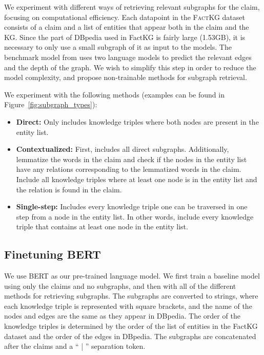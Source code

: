 \documentclass[11pt]{article}
\begin{document}
We experiment with different ways of retrieving relevant subgraphs for the claim, focusing on computational efficiency. Each datapoint in the \textsc{FactKG} dataset consists of a claim and a list of entities that appear both in the claim and the KG. Since the part of DBpedia used in FactKG is fairly large (1.53GB), it is necessary to only use a small subgraph of it as input to the models. The benchmark model from \citet{kim2023factkg} uses two language models to predict the relevant edges and the depth of the graph. We wish to simplify this step in order to reduce the model complexity, and propose non-trainable methods for subgraph retrieval.



We experiment with the following methods (examples can be found in Figure~\ref{fig:subgraph_types}):

\begin{itemize}
    \item \textbf{Direct:} Only includes knowledge triples where both nodes are present in the entity list.
    \item \textbf{Contextualized:} First, includes all direct subgraphs. Additionally, lemmatize the words in the claim and check if the nodes in the entity list have any relations corresponding to the lemmatized words in the claim. Include all knowledge triples where at least one node is in the entity list and the relation is found in the claim.
    \item \textbf{Single-step:} Includes every knowledge triple one can be traversed in one step from a node in the entity list. In other words, include every knowledge triple that contains at least one node in the entity list.
\end{itemize}


\subsection{Finetuning BERT}

We use BERT \citep{devlin2018bert} as our pre-trained language model. We first train a baseline model using only the claims and no subgraphs, and then with all of the different methods for retrieving subgraphs. The subgraphs are converted to strings, where each knowledge triple is represented with square brackets, and the name of the nodes and edges are the same as they appear in DBpedia. The order of the knowledge triples is determined by the order of the list of entities in the FactKG dataset and the order of the edges in DBpedia. The subgraphs are concatenated after the claims and a `` | '' separation token.
\end{document}
